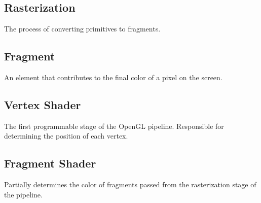 \documentclass{article}
\begin{document}
  \subsection{Rasterization}
  The process of converting primitives to fragments.
  \subsection{Fragment}
  An element that contributes to the final color of a pixel on the screen.
  \subsection{Vertex Shader}
  The first programmable stage of the OpenGL pipeline. Responsible for determining the position of each vertex.
  \subsection{Fragment Shader}
  Partially determines the color of fragments passed from the rasterization stage of the pipeline.
  \clearpage
    
  \nocite{*}
  {}
  
  
\end{document}
